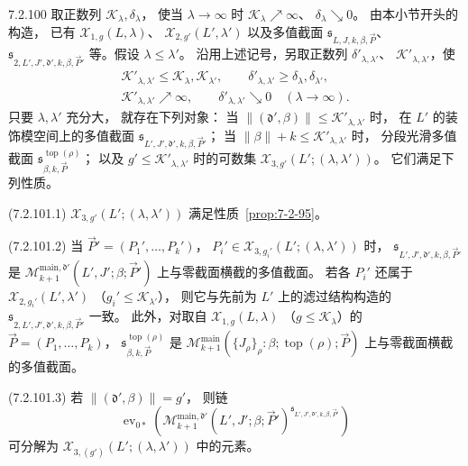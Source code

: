 \begin{proposition}{7.2.100}\label{prop:7-2-100}
取正数列
$\mathcal K_\lambda,\delta_\lambda$，
使当 $\lambda\to\infty$ 时
$\mathcal K_\lambda\nearrow\infty$、
$\delta_\lambda\searrow0$。
由本小节开头的构造，
已有 $\mathcal X_{1,g}(L,\lambda)$、
$\mathcal X_{2,g'}(L',\lambda')$
以及多值截面
$\mathfrak s_{L,J,k,\beta,\vec P}$、
$\mathfrak s_{2,L',J',\mathfrak d',k,\beta,\vec P'}$
等。假设 $\lambda\le\lambda'$。
沿用上述记号，另取正数列
$\delta'_{\lambda,\lambda'}$、
$\mathcal K'_{\lambda,\lambda'}$，使
\[
\begin{gathered}
\mathcal K'_{\lambda,\lambda'}\le
\mathcal K_\lambda,\mathcal K_{\lambda'},
\qquad
\delta'_{\lambda,\lambda'}\ge
\delta_\lambda,\delta_{\lambda'},\\
\mathcal K'_{\lambda,\lambda'}\nearrow\infty,
\qquad
\delta'_{\lambda,\lambda'}\searrow0
\quad(\lambda\to\infty).
\end{gathered}
\]
只要 $\lambda,\lambda'$ 充分大，
就存在下列对象：
当 $\|(\mathfrak d',\beta)\|
\le\mathcal K'_{\lambda,\lambda'}$ 时，
在 $L'$ 的装饰模空间上的多值截面
$\mathfrak s_{L',J',\mathfrak d',k,\beta,\vec P'}$；
当 $\|\beta\|+k\le
\mathcal K'_{\lambda,\lambda'}$ 时，
分段光滑多值截面
$\mathfrak s^{\operatorname{top}(\rho)}_{\beta,k,\vec P}$；
以及 $g'\le\mathcal K'_{\lambda,\lambda'}$
时的可数集
$\mathcal X_{3,g'}(L';(\lambda,\lambda'))$。
它们满足下列性质。

\noindent\textup{(7.2.101.1)}\quad
$\mathcal X_{3,g'}(L';(\lambda,\lambda'))$
满足性质~\ref{prop:7-2-95}。

\noindent\textup{(7.2.101.2)}\quad
当 $\vec P'=(P_1',\ldots,P_k')$，
$P_i'\in\mathcal X_{3,g_i'}(L';(\lambda,\lambda'))$
时，
$\mathfrak s_{L',J',\mathfrak d',k,\beta,\vec P'}$
是
$\mathcal M^{\mathrm{main},\mathfrak d'}_{k+1}
(L',J';\beta;\vec P')$
上与零截面横截的多值截面。
若各 $P_i'$ 还属于
$\mathcal X_{2,g_i'}(L',\lambda')$
（$g_i'\le\mathcal K_{\lambda'}$），
则它与先前为 $L'$ 上的滤过结构构造的
$\mathfrak s_{2,L',J',\mathfrak d',k,\beta,\vec P'}$
一致。
此外，对取自
$\mathcal X_{1,g}(L,\lambda)$
（$g\le\mathcal K_\lambda$）的
$\vec P=(P_1,\ldots,P_k)$，
$\mathfrak s^{\operatorname{top}(\rho)}_{\beta,k,\vec P}$
是
$\mathcal M^{\mathrm{main}}_{k+1}
(\{J_\rho\}_\rho:\beta;
\operatorname{top}(\rho);\vec P)$
上与零截面横截的多值截面。

\noindent\textup{(7.2.101.3)}\quad
若 $\|(\mathfrak d',\beta)\|=g'$，
则链
\[
\operatorname{ev}_{0*}\left(
\mathcal M^{\mathrm{main},\mathfrak d'}_{k+1}
(L',J';\beta;\vec P')
^{\mathfrak s_{L',J',\mathfrak d',k,\beta,\vec P'}}
\right)
\]
可分解为
$\mathcal X_{3,(g')}(L';(\lambda,\lambda'))$
中的元素。


\end{proposition}
